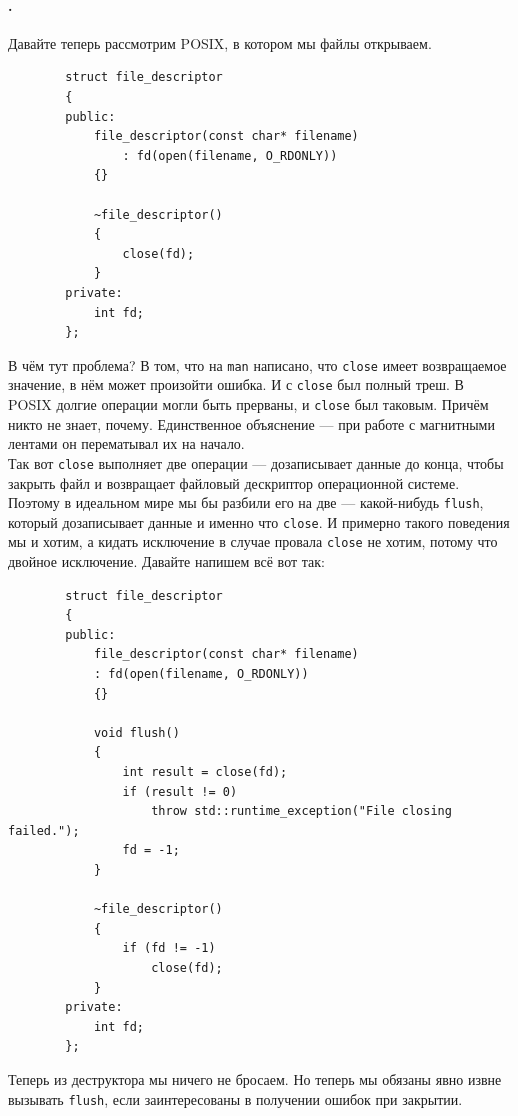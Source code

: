 \documentclass{article}
\begin{document}
    \paragraph{.}
    Давайте теперь рассмотрим POSIX, в котором мы файлы открываем.
    \begin{verbatim}
        struct file_descriptor
        {
        public:          
            file_descriptor(const char* filename)
                : fd(open(filename, O_RDONLY))
            {}

            ~file_descriptor()
            {
                close(fd);
            }
        private:
            int fd;
        };
    \end{verbatim}
    В чём тут проблема? В том, что на \texttt{man} написано, что \texttt{close} имеет возвращаемое значение, в нём может произойти ошибка. И с \texttt{close} был полный треш. В POSIX долгие операции могли быть прерваны, и \texttt{close} был таковым. Причём никто не знает, почему. Единственное объяснение --- при работе с магнитными лентами он перематывал их на начало.\\
    Так вот \texttt{close} выполняет две операции --- дозаписывает данные до конца, чтобы закрыть файл и возвращает файловый дескриптор операционной системе. Поэтому в идеальном мире мы бы разбили его на две --- какой-нибудь \texttt{flush}, который дозаписывает данные и именно что \texttt{close}. И примерно такого поведения мы и хотим, а кидать исключение в случае провала \texttt{close} не хотим, потому что двойное исключение. Давайте напишем всё вот так:
    \begin{verbatim}
        struct file_descriptor
        {
        public:          
            file_descriptor(const char* filename)
            : fd(open(filename, O_RDONLY))
            {}
            
            void flush()
            {
                int result = close(fd);
                if (result != 0)
                    throw std::runtime_exception("File closing failed.");
                fd = -1;
            }
            
            ~file_descriptor()
            {
                if (fd != -1)
                    close(fd);
            }
        private:
            int fd;
        };
    \end{verbatim}
    Теперь из деструктора мы ничего не бросаем. Но теперь мы обязаны явно извне вызывать \texttt{flush}, если заинтересованы в получении ошибок при закрытии.
\end{document}
